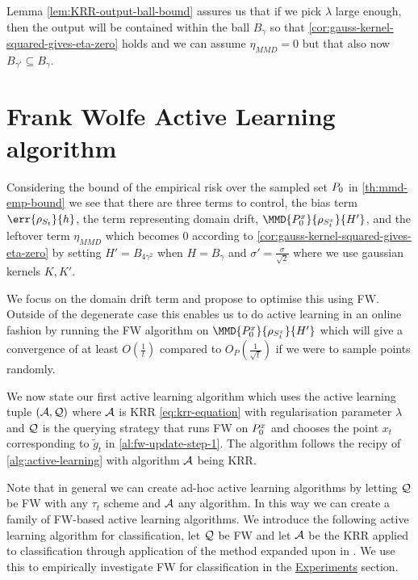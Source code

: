 Lemma \ref{lem:KRR-output-ball-bound} assures us that if we pick \(\lambda\)
large enough, then the output will be contained within the ball \(B_{\gamma}\)
so that \ref{cor:gauss-kernel-squared-gives-eta-zero} holds and we can assume
\(\eta_{MMD} = 0\) but that also now \(B_{\gamma'} \subseteq B_{\gamma}\).

\section{Frank Wolfe Active Learning algorithm}
Considering the bound of the empirical risk over the sampled set
\(P_{0}\) in \ref{th:mmd-emp-bound} we see that there are three terms to
control, the bias term \(\err{\rho_{\trainset_{t}}}{h}\), the term representing
domain drift, \(\MMD{\poolsetx_{0}}{\rho_{\trainsetx_{t}}}{H'}\), and the leftover term
\(\eta_{MMD}\) which becomes \(0\) according to
\ref{cor:gauss-kernel-squared-gives-eta-zero} by setting \(H' =
B_{4\gamma^{2}}\) when \(H = B_{\gamma}\) and \(\sigma' = \frac{\sigma}{\sqrt{2}}\) where we use gaussian kernels \(K, K'\).

We focus on the domain drift term and propose to optimise this using FW. Outside
of the degenerate case this enables us to do active learning in an online
fashion by running the FW algorithm on
\(\MMD{\poolsetx_{0}}{\rho_{\trainsetx_{t}}}{H'}\) which will give a convergence
of at least \(O(\frac{1}{t})\) compared to \(O_P(\frac{1}{\sqrt{t}})\) if we were
to sample points randomly.

We now state our first active learning algorithm which uses the active learning
tuple \((\mathcal{A}, \mathcal{Q})\) where \(\mathcal{A}\) is KRR \ref{eq:krr-equation} with regularisation
parameter \(\lambda\) and \(\mathcal{Q}\) is the querying strategy that runs FW on
\(P^x_{0}\) and chooses the point \(x_{t}\) corresponding to
\(\tilde{g}_{t}\) in \ref{al:fw-update-step-1}. The algorithm follows the recipy of
\ref{alg:active-learning} with algorithm \(\mathcal{A}\) being KRR.

Note that in general we can create ad-hoc active learning algorithms by letting
\(\mathcal{Q}\) be FW with any \(\tau_t\) scheme and \(\mathcal{A}\) any algorithm. In
this way we can create a family of FW-based active learning algorithms. We
introduce the following active learning algorithm for classification, let
\(\mathcal{Q}\) be FW and let \(\mathcal{A}\) be the KRR applied to classification
through application of the method expanded upon in \citep{ciliberto16}. We use
this to empirically investigate FW for classification in the
\hyperref[ch:experiments]{Experiments} section.

